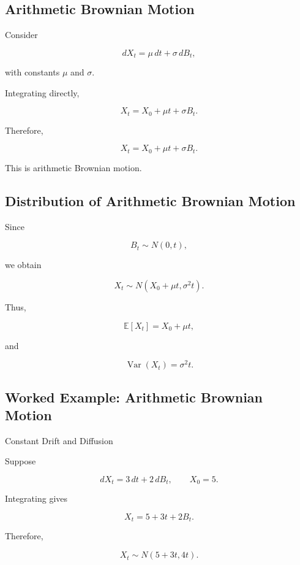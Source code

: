 \subsection{Arithmetic Brownian Motion}
\label{subsec:arithmetic-brownian-motion}

Consider

\[
\boxed{
dX_t
=
\mu\,dt
+
\sigma\,dB_t,
}
\]

with constants \(\mu\) and \(\sigma\).

Integrating directly,

\[
X_t
=
X_0
+
\mu t
+
\sigma B_t.
\]

Therefore,

\[
\boxed{
X_t
=
X_0+\mu t+\sigma B_t.
}
\]

This is arithmetic Brownian motion.

\subsection{Distribution of Arithmetic Brownian Motion}
\label{subsec:arithmetic-brownian-distribution}

Since

\[
B_t\sim N(0,t),
\]

we obtain

\[
\boxed{
X_t
\sim
N
\left(
X_0+\mu t,
\sigma^2t
\right).
}
\]

Thus,

\[
\boxed{
\mathbb{E}[X_t]
=
X_0+\mu t,
}
\]

and

\[
\boxed{
\operatorname{Var}(X_t)
=
\sigma^2t.
}
\]

\subsection{Worked Example: Arithmetic Brownian Motion}
\label{subsec:worked-arithmetic-brownian}

\begin{workedexamplebox}{Constant Drift and Diffusion}

Suppose

\[
dX_t
=
3\,dt
+
2\,dB_t,
\qquad
X_0=5.
\]

Integrating gives

\[
X_t
=
5+3t+2B_t.
\]

Therefore,

\begin{answerbox}
\[
\boxed{
X_t
\sim
N(5+3t,4t).
}
\]
\end{answerbox}

\end{workedexamplebox}

